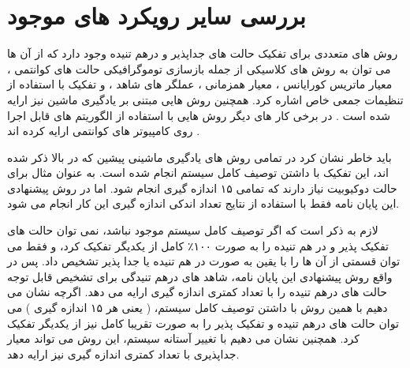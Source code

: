 \section{بررسی سایر رویکرد های موجود}

روش های متعددی برای تفکیک حالت های جداپذیر و درهم تنیده وجود دارد که از آن ها می توان به روش های کلاسیکی از جمله بازسازی توموگرافیکی
حالت های کوانتمی
\cite{Lu2016}،
معیار ماتریس کورایانس
\cite{Guhne2007}،
معیار همزمانی
\cite{Wootters1998,Rungta2001,DeVicente2007}،
عملگر های شاهد
\cite{horodecki_1996,Terhal2000}،
و تفکیک با استفاده از تنظیمات جمعی خاص
\cite{Pezze2016}
اشاره کرد.
همچنین روش هایی مبتنی بر یادگیری ماشین نیز ارایه شده است
\cite{Wisniewska2015,Gao2018,Ma2018,Lu2018,Gray2018,Deng2018,Levine2018,Liu2018,Qiu2019}.
در برخی کار های دیگر روش هایی با استفاده از الگوریتم های قابل اجرا روی کامپیوتر های کوانتمی ارایه کرده اند
\cite{Cai2015,behrman2002}.

باید خاطر نشان کرد در تمامی روش های یادگیری ماشینی پیشین که در بالا ذکر شده اند، این تفکیک با داشتن توصیف کامل سیستم انجام شده است. به عنوان مثال برای حالت دوکیوبیت نیاز دارند که تمامی
۱۵
اندازه گیری انجام شود.
اما در روش پیشنهادی این پایان نامه فقط با استفاده از نتایج تعداد اندکی اندازه گیری این کار انجام می شود.

لازم به ذکر است که اگر توصیف کامل سیستم موجود نباشد، نمی توان حالت های تفکیک پذیر و در هم تنیده را به صورت
۱۰۰٪
کامل از یکدیگر تفکیک کرد، و فقط می توان قسمتی از آن ها را با یقین به صورت در هم تنیده یا جدا پذیر تشخیص داد. پس در واقع روش پیشنهادی این پایان نامه، شاهد های درهم تنیدگی برای تشخیص قابل توجه حالت های درهم تنیده را با تعداد کمتری اندازه گیری ارایه می دهد. اگرچه نشان می دهیم با همین روش با داشتن توصیف کامل سیستم،
(
یعنی هر ۱۵ اندازه گیری
)
می توان حالت های درهم تنیده و تفکیک پذیر را به صورت تقریبا کامل نیز از یکدیگر تفکیک کرد.
همچنین نشان می دهیم با تغییر آستانه
سیستم، این روش می تواند معیار جداپذیری
با تعداد کمتری اندازه گیری نیز ارایه دهد.
